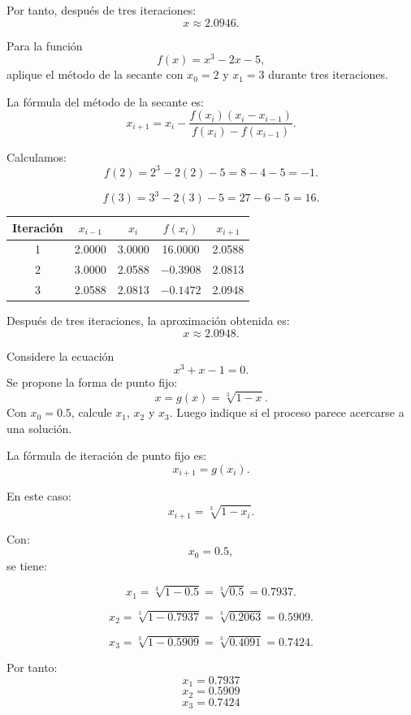 \documentclass[11pt,respuestas,a4]{aleph-examen}
\begin{document}
\begin{preguntas}
\begin{respuesta}
Por tanto, después de tres iteraciones:
\[
\boxed{x\approx 2.0946}.
\]
\end{respuesta}


\item
Para la función  
\[
f(x)=x^3-2x-5,
\]
aplique el método de la secante con $x_0=2$ y $x_1=3$ durante tres iteraciones.

\begin{respuesta}
La fórmula del método de la secante es:
\[
x_{i+1}=x_i-\frac{f(x_i)(x_i-x_{i-1})}{f(x_i)-f(x_{i-1})}.
\]

Calculamos:
\[
f(2)=2^3-2(2)-5=8-4-5=-1.
\]

\[
f(3)=3^3-2(3)-5=27-6-5=16.
\]

\begin{center}
\renewcommand{\arraystretch}{1.3}
\begin{tabular}{c|c|c|c|c}
\toprule
Iteración & $x_{i-1}$ & $x_i$ & $f(x_i)$ & $x_{i+1}$ \\
\midrule
1 & 2.0000 & 3.0000 & 16.0000 & 2.0588 \\
2 & 3.0000 & 2.0588 & $-0.3908$ & 2.0813 \\
3 & 2.0588 & 2.0813 & $-0.1472$ & 2.0948 \\
\bottomrule
\end{tabular}
\end{center}

Después de tres iteraciones, la aproximación obtenida es:
\[
\boxed{x\approx 2.0948}.
\]
\end{respuesta}


\item
Considere la ecuación 
\[
x^3+x-1=0.
\]
Se propone la forma de punto fijo:
\[
x=g(x)=\sqrt[3]{1-x}.
\]
Con $x_0=0.5$, calcule $x_1$, $x_2$ y $x_3$. Luego indique si el proceso parece acercarse a una solución.

\begin{respuesta}
La fórmula de iteración de punto fijo es:
\[
x_{i+1}=g(x_i).
\]

En este caso:
\[
x_{i+1}=\sqrt[3]{1-x_i}.
\]

Con:
\[
x_0=0.5,
\]
se tiene:

\[
x_1=\sqrt[3]{1-0.5}=\sqrt[3]{0.5}=0.7937.
\]

\[
x_2=\sqrt[3]{1-0.7937}=\sqrt[3]{0.2063}=0.5909.
\]

\[
x_3=\sqrt[3]{1-0.5909}=\sqrt[3]{0.4091}=0.7424.
\]

Por tanto:
\[
\boxed{x_1=0.7937}
\]
\[
\boxed{x_2=0.5909}
\]
\[
\boxed{x_3=0.7424}
\]


\end{respuesta}
\end{preguntas}
\end{document}
